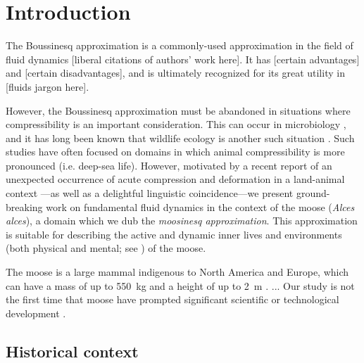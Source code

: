 \section{Introduction}
\label{sec:introduction}

The Boussinesq approximation is a commonly-used approximation in the field of fluid dynamics [liberal citations of authors' work here].
It has [certain advantages] and [certain disadvantages], and is ultimately recognized for its great utility in [fluids jargon here].

However, the Boussinesq approximation must be abandoned in situations where compressibility is an important consideration.
This can occur in microbiology \citep{Ravetto2014}, and it has long been known that wildlife ecology is another such situation \citep[e.g.][]{Enright1963}.
Such studies have often focused on domains in which animal compressibility is more pronounced (i.e. deep-sea life).
However, motivated by a recent report of an unexpected occurrence of acute compression and deformation in a land-animal context \citep{Gudmannsson2018}---as well as a delightful linguistic coincidence---we present ground-breaking work on fundamental fluid dynamics in the context of the moose (\textit{Alces alces}), a domain which we dub the \textit{moosinesq approximation}.
This approximation is suitable for describing the active and dynamic inner lives and environments (both physical and mental; see \citealp{Gibson2015}) of the moose.

The moose is a large mammal indigenous to North America and Europe, which can have a mass of up to 550~kg and a height of up to 2~m \citep{CPWmoose}.
...
Our study is not the first time that moose have prompted significant scientific or technological development \citep[see, e.g.,][]{Handel2009}.

\subsection{Historical context}

